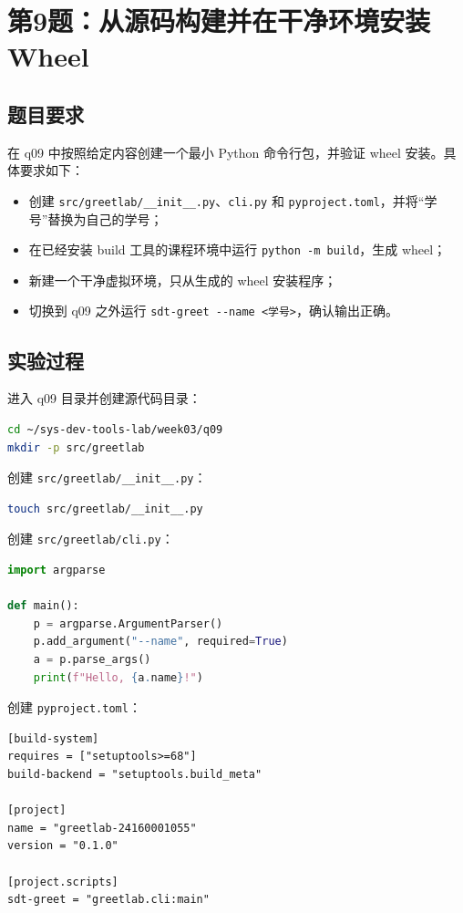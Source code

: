 \documentclass[UTF8,a4paper,12pt]{ctexart}
\begin{document}
\section{第9题：从源码构建并在干净环境安装 Wheel}

\subsection*{题目要求}

在 q09 中按照给定内容创建一个最小 Python 命令行包，并验证 wheel 安装。具体要求如下：

\begin{itemize}
    \item 创建 \verb|src/greetlab/__init__.py|、\verb|cli.py| 和 \verb|pyproject.toml|，并将“学号”替换为自己的学号；
    \item 在已经安装 build 工具的课程环境中运行 \verb|python -m build|，生成 wheel；
    \item 新建一个干净虚拟环境，只从生成的 wheel 安装程序；
    \item 切换到 q09 之外运行 \verb|sdt-greet --name <学号>|，确认输出正确。
\end{itemize}

\subsection*{实验过程}

进入 q09 目录并创建源代码目录：

\begin{lstlisting}[language=bash]
cd ~/sys-dev-tools-lab/week03/q09
mkdir -p src/greetlab
\end{lstlisting}

创建 \verb|src/greetlab/__init__.py|：

\begin{lstlisting}[language=bash]
touch src/greetlab/__init__.py
\end{lstlisting}

创建 \verb|src/greetlab/cli.py|：

\begin{lstlisting}[language=Python]
import argparse

def main():
    p = argparse.ArgumentParser()
    p.add_argument("--name", required=True)
    a = p.parse_args()
    print(f"Hello, {a.name}!")
\end{lstlisting}

创建 \verb|pyproject.toml|：

\begin{lstlisting}
[build-system]
requires = ["setuptools>=68"]
build-backend = "setuptools.build_meta"

[project]
name = "greetlab-24160001055"
version = "0.1.0"

[project.scripts]
sdt-greet = "greetlab.cli:main"
\end{lstlisting}
\end{document}
